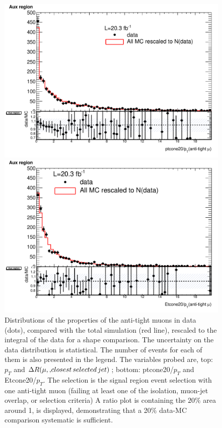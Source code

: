 \begin{figure}[!htbp]
\begin{minipage}[h]{0.5\textwidth}
    \centering \includegraphics[width=\textwidth]{figs/fake/h_relptcone20_CR_early_AF2_extrap_MET50_noIso_RESCALED}
  \end{minipage}\hfill
  \begin{minipage}[h]{0.5\textwidth}
    \centering \includegraphics[width=\textwidth]{figs/fake/h_reletcone20_CR_early_AF2_extrap_MET50_noIso_RESCALED}
  \end{minipage}\hfill
  \caption{Distributions of the properties of the anti-tight muons in data (dots), compared with the total simulation (red line), rescaled to the integral of the data for a shape comparison. The uncertainty on the data distribution is statistical. The number of events for each of them is also presented in the legend. The variables probed are, top: $p_T$ and $\Delta R(\mu, {\rm , closest \, selected \, jet})$; bottom: ptcone20/$p_T$ and Etcone20/$p_T$. The selection is the signal region event selection with one anti-tight muon (failing at least one of the isolation, muon-jet overlap, or \pt selection criteria) A ratio plot is containing the $20\%$ area around 1, is displayed, demonstrating that a 20\% data-MC comparison systematic is sufficient.}
  \label{figure:background_muon_dataMC}
\end{figure} 


